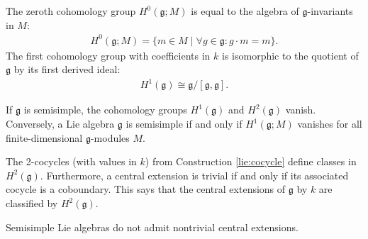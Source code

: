     \begin{property}[$H^0$ and $H^1$]
        The zeroth cohomology group $H^0(\mathfrak{g};M)$ is equal to the algebra of $\mathfrak{g}$-invariants in $M$:
        \begin{gather}
            \label{lie:zeroth_cohomology}
            H^0(\mathfrak{g};M) = \{m\in M\mid\forall g\in\mathfrak{g}:g\cdot m = m\}.
        \end{gather}
        The first cohomology group with coefficients in $k$ is isomorphic to the quotient of $\mathfrak{g}$ by its first derived ideal:
        \begin{gather}
            H^1(\mathfrak{g})\cong\mathfrak{g}/[\mathfrak{g},\mathfrak{g}].
        \end{gather}
    \end{property}

    \begin{property}
        If $\mathfrak{g}$ is semisimple, the cohomology groups $H^1(\mathfrak{g})$ and $H^2(\mathfrak{g})$ vanish. Conversely, a Lie algebra $\mathfrak{g}$ is semisimple if and only if $H^1(\mathfrak{g};M)$ vanishes for all finite-dimensional $\mathfrak{g}$-modules $M$.
    \end{property}

    \begin{property}
        The 2-cocycles (with values in $k$) from Construction \ref{lie:cocycle} define classes in $H^2(\mathfrak{g})$. Furthermore, a central extension is trivial if and only if its associated cocycle is a coboundary. This says that the central extensions of $\mathfrak{g}$ by $k$ are classified by $H^2(\mathfrak{g})$.
    \end{property}
    \begin{result}
        Semisimple Lie algebras do not admit nontrivial central extensions.
    \end{result}


